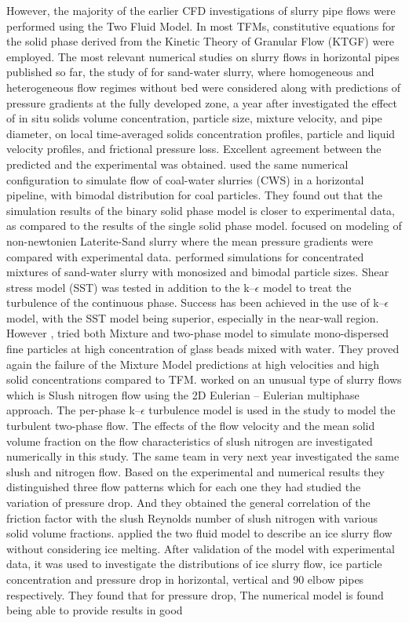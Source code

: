 \documentclass[11pt]{report}
\begin{document}
However, the majority of the earlier CFD investigations of slurry pipe flows were performed using the Two Fluid Model. In most TFMs, constitutive equations for the solid phase derived from the Kinetic Theory of Granular Flow (KTGF) were employed. The most relevant numerical studies on slurry flows in horizontal pipes published so far, the study of  \citet{herna2008cfd} for sand-water slurry, where homogeneous and heterogeneous flow regimes without bed were considered along with predictions of pressure gradients at the fully developed zone, a year after \citet{Ekambara-2009} investigated the effect of in situ solids volume concentration, particle size, mixture velocity, and pipe diameter, on local time-averaged solids concentration profiles, particle and liquid velocity profiles, and frictional pressure loss. Excellent agreement between the predicted and the experimental was obtained. \citet{Liangyon-2009} used the same numerical configuration to simulate flow of coal-water slurries (CWS) in a horizontal pipeline, with bimodal distribution for coal particles. They found out that the simulation results of the binary solid phase model is closer to experimental data, as compared to the results of the single solid phase model. \citet{bossio2009eulerian} focused on modeling of non-newtonien Laterite-Sand slurry where the mean pressure gradients were compared with experimental data. \citet{antaya2012modelling}  performed simulations for concentrated mixtures of sand-water slurry with monosized and bimodal particle sizes. Shear stress model (SST) was tested in addition to the k–$\epsilon$ model to treat the turbulence of the continuous  phase. Success has been achieved in the use of  k–$\epsilon$ model,  with the SST model being superior, especially in the near-wall region. However \citet{D.R-2012}, tried both  Mixture and  two-phase model to simulate mono-dispersed fine particles at high concentration of glass beads mixed with water. They proved again the failure of the Mixture Model predictions at high velocities and high solid concentrations compared to TFM. \cite{Y.Y-2012} worked on an unusual type of slurry flows which is Slush nitrogen flow using the 2D Eulerian – Eulerian multiphase approach. The per-phase k–$\epsilon$ turbulence model is used in the study to model the turbulent two-phase flow. The effects of the flow velocity and the mean solid volume fraction on the flow characteristics of slush nitrogen are investigated numerically in this study. The same team in very next year \citet{Jiang-2013} investigated the same slush and nitrogen flow. Based on the experimental and numerical results they distinguished three flow patterns which for each one they had studied the variation of pressure drop. And they obtained the general correlation of the friction factor with the slush Reynolds number of slush nitrogen with various solid volume fractions. \citet{Wang-2013} applied the two fluid model to describe an ice slurry flow without considering ice melting. After validation of the model with experimental data, it was used to investigate  the distributions of ice slurry flow, ice particle concentration and pressure drop in horizontal, vertical and 90 elbow pipes respectively. They found that for pressure drop, The numerical model is found being able to provide results in good 
\end{document}

